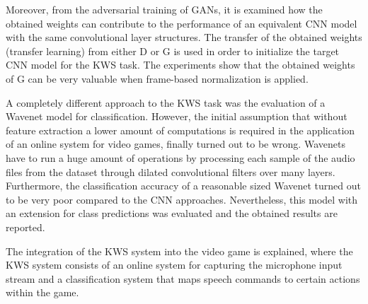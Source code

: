 Moreover, from the adversarial training of GANs, it is examined how the obtained weights can contribute to the performance of an equivalent CNN model with the same convolutional layer structures.
The transfer of the obtained weights (transfer learning) from either D or G is used in order to initialize the target CNN model for the KWS task.
The experiments show that the obtained weights of G can be very valuable when frame-based normalization is applied.

A completely different approach to the KWS task was the evaluation of a Wavenet \cite{Oord2016} model for classification.
However, the initial assumption that without feature extraction a lower amount of computations is required in the application of an online system for video games, finally turned out to be wrong.
Wavenets have to run a huge amount of operations by processing each sample of the audio files from the dataset through dilated convolutional filters over many layers.
Furthermore, the classification accuracy of a reasonable sized Wavenet turned out to be very poor compared to the CNN approaches.
Nevertheless, this model with an extension for class predictions was evaluated and the obtained results are reported.

The integration of the KWS system into the video game is explained, where the KWS system consists of an online system for capturing the microphone input stream and a classification system that maps speech commands to certain actions within the game.
